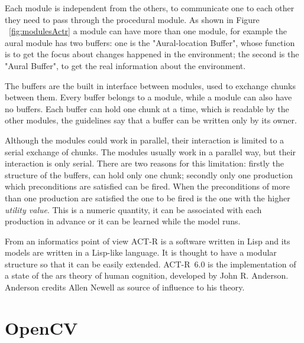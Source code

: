 Each module is independent from the others, to communicate one to each other they need to pass through the procedural module. As shown in Figure  ~\ref{fig:modulesActr} a module can have more than one module, for example the aural module has two buffers: one is the "Aural-location Buffer", whose function is to get the focus about changes happened in the environment; the second is the "Aural Buffer", to get the real information about the environment.

The buffers are the built in interface between modules, used to exchange chunks between them. Every buffer belongs to a module, while a module can also have no buffers. Each buffer can hold one chunk at a time, which is readable by the other modules, the guidelines say that a buffer can be written only by its owner. 

Although the modules could work in parallel, their interaction is limited to a serial exchange of chunks. The modules usually work in a parallel way, but their interaction is only serial. There are two reasons for this limitation: firstly the structure of the buffers, can hold only one chunk; secondly only one production which preconditions are satisfied can be fired. When the preconditions of more than one production are satisfied the one to be fired is the one with the higher \emph{utility value}. This is a numeric quantity, it can be associated with each production in advance or it can be learned while the model runs.



From an informatics point of view \mbox{ACT-R} is a software written in Lisp and its models are written in a Lisp-like language. It is thought to have a modular structure so that it can be easily extended. \mbox{ACT-R 6.0} is the implementation of a state of the ars theory of human cognition, developed by John R. Anderson. Anderson credits Allen Newell as source of influence to his theory.
\section{OpenCV}
